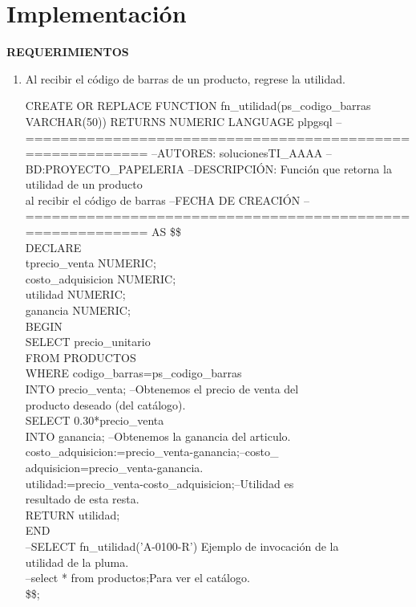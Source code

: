\documentclass[10pt]{report}
\begin{document}
\chapter*{Implementación}

\textbf{REQUERIMIENTOS}

\begin{enumerate}
    \item Al recibir el código de barras de un producto, regrese la utilidad.
    
    \begin{flushleft} \ttfamily
    CREATE OR REPLACE FUNCTION fn\_utilidad(ps\_codigo\_barras VARCHAR(50))
    RETURNS NUMERIC LANGUAGE plpgsql
    --==========================================================
    --AUTORES: solucionesTI\_AAAA
    --BD:PROYECTO\_PAPELERIA
    --DESCRIPCIÓN: Función que retorna la utilidad de un producto\\ al recibir el código de barras
    --FECHA DE CREACIÓN 
    --==========================================================
    AS \$\$\\
    DECLARE\\
	    tprecio\_venta 	  NUMERIC;\\
		costo\_adquisicion NUMERIC;\\
		utilidad 		  NUMERIC;\\
		ganancia		  NUMERIC;\\
    BEGIN\\
	    SELECT precio\_unitario\\
	    FROM PRODUCTOS\\
	    WHERE codigo\_barras=ps\_codigo\_barras\\
	    INTO precio\_venta; --Obtenemos el precio de venta del\\ producto deseado (del catálogo).\\
	
	    SELECT 0.30*precio\_venta\\
	    INTO ganancia; --Obtenemos la ganancia del articulo.\\
	
	    costo\_adquisicion:=precio\_venta-ganancia;--costo\_\\
	    adquisicion=precio\_venta-ganancia.\\
	    utilidad:=precio\_venta-costo\_adquisicion;--Utilidad es\\ resultado de esta resta.\\
	
	    RETURN utilidad;\\
    END\\
    --SELECT fn\_utilidad('A-0100-R') Ejemplo de invocación de la\\ utilidad de la pluma.\\
    --select * from productos;Para ver el catálogo.\\
    \$\$;\\
    

\end{flushleft}
\end{enumerate}
\end{document}
